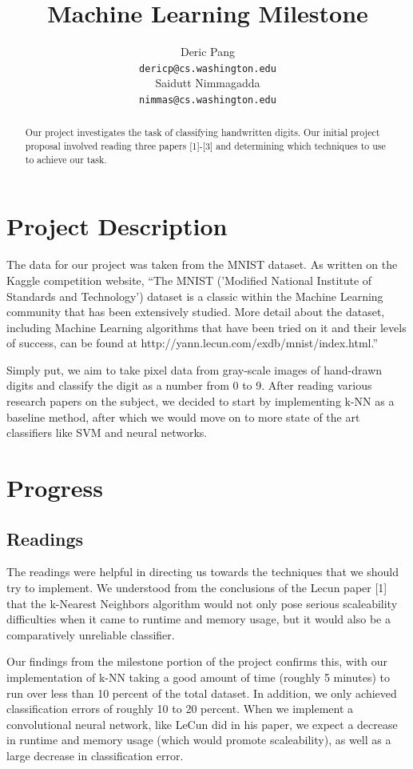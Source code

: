 \documentclass{article} %
\title{Machine Learning Milestone}
\author{
Deric Pang \\
\texttt{dericp@cs.washington.edu} \\
\And
Saidutt Nimmagadda \\
\texttt{nimmas@cs.washington.edu} \\
}
\begin{document}
\maketitle

\begin{abstract}
Our project investigates the task of classifying handwritten digits. Our initial
project proposal involved reading three papers [1]-[3] and determining which
techniques to use to achieve our task.
\end{abstract}

\section{Project Description}

The data for our project was taken from the MNIST dataset. As written on the
Kaggle competition website, ``The MNIST
('Modified National Institute of Standards and Technology') dataset
is a classic within the Machine Learning community that has been extensively
studied. More detail about the dataset, including Machine Learning algorithms
that have been tried on it and their levels of success, can be found at
http://yann.lecun.com/exdb/mnist/index.html.''

Simply put, we aim to take pixel data from gray-scale images of hand-drawn digits
and classify the digit as a number from 0 to 9. After reading various research
papers on the subject, we decided to start by implementing k-NN as a baseline
method, after which we would move on to more state of the art classifiers like
SVM and neural networks.

\section{Progress}

\subsection{Readings}
The readings were helpful in directing us towards the techniques that we should
try to implement. We understood from the
conclusions of the Lecun paper [1] that the k-Nearest Neighbors algorithm would not
only pose serious scaleability difficulties when it came to runtime and memory
usage, but it would also be a comparatively unreliable classifier.

Our findings from the milestone portion of the project confirms this, with our implementation
of k-NN taking a good amount of time (roughly 5 minutes) to run over less than
10 percent of the total dataset. In addition, we only achieved classification
errors of roughly 10 
to 20 percent. When we implement a convolutional neural network, like LeCun did
in his paper, we expect a decrease in runtime and memory usage (which
would promote scaleability), as well as a large decrease in classification error.
\end{document}
